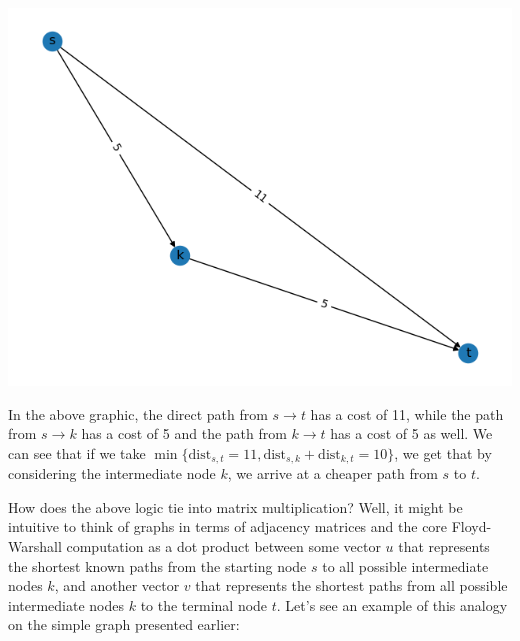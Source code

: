 \documentclass[12pt]{article}
\begin{document}
\begin{center}
    \includegraphics[scale=0.5]{media/Figure_1.png}
\end{center}

In the above graphic, the direct path from $s \to t$ has a cost of 11, while the path from $s \to k$ has a cost of 5 and the path from $k \to t$ has a cost of 5 as well. We can see that if we take $\min \{\mathrm{dist}_{s,t} = 11, \mathrm{dist}_{s,k} + \mathrm{dist}_{k,t} = 10 \}$, we get that by considering the intermediate node $k$, we arrive at a cheaper path from $s$ to $t$.

How does the above logic tie into matrix multiplication? Well, it might be intuitive to think of graphs in terms of adjacency matrices and the core Floyd-Warshall computation as a dot product between some vector $u$ that represents the shortest known paths from the starting node $s$ to all possible intermediate nodes $k$, and another vector $v$ that represents the shortest paths from all possible intermediate nodes $k$ to the terminal node $t$. Let's see an example of this analogy on the simple graph presented earlier:
\end{document}
